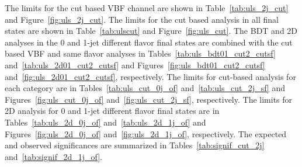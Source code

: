 The limits for the cut based VBF channel are shown in 
Table~\ref{tab:uls_2j_cut} and Figure~\ref{fig:uls_2j_cut}.
The limits for the cut based analysis in all final states are shown in
Table~\ref{tab:ulscut} and Figure~\ref{fig:uls_cut}.
The BDT and 2D analyses in the 0 and 1-jet different flavor final states
are combined with the cut based VBF and same flavor analyses in
Tables~\ref{tab:uls_bdt01_cut2_cutsf} and~\ref{tab:uls_2d01_cut2_cutsf}
and Figures~\ref{fig:uls_bdt01_cut2_cutsf} and~\ref{fig:uls_2d01_cut2_cutsf}, 
respectively.
The limits for cut-based analysis for each category are in 
Tables~\ref{tab:uls_cut_0j_of} and~\ref{tab:uls_cut_2j_sf}
and Figures~\ref{fig:uls_cut_0j_of} and~\ref{fig:uls_cut_2j_sf},
respectively.
The limits for 2D analysis for 0 and 1-jet different flavor final states are in 
Tables~\ref{tab:uls_2d_0j_of} and~\ref{tab:uls_2d_1j_of}
and Figures~\ref{fig:uls_2d_0j_of} and~\ref{fig:uls_2d_1j_of},
respectively.
The expected and observed significances are summarized in Tables~\ref{tab:signif_cut_2j} and~\ref{tab:signif_2d_1j_of}. 


